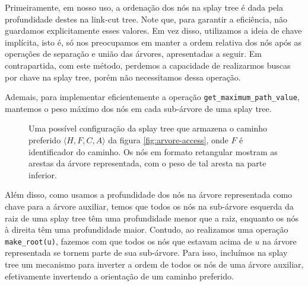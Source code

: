 Primeiramente, em nosso uso, a ordenação dos nós na splay tree é dada pela profundidade destes na link-cut tree. Note que, para garantir a eficiência, não guardamos explicitamente esses valores. Em vez disso, utilizamos a ideia de chave implícita, isto é, só nos preocupamos em manter a ordem relativa dos nós após as operações de separação e união das árvores, apresentadas a seguir. Em contrapartida, com este método, perdemos a capacidade de realizarmos buscas por chave na splay tree, porém não necessitamos dessa operação.

Ademais, para implementar eficientemente a operação \texttt{get\_maximum\_path\_value}, mantemos o peso máximo dos nós em cada sub-árvore de uma splay tree.

\begin{figure}
    \centering
    \caption{Uma possível configuração da splay tree que armazena o caminho preferido $\langle H,F,C,A \rangle$ da figura \ref{fig:arvore-access}, onde $F$ é identificador do caminho. Os nós em formato retangular mostram as arestas da árvore representada, com o peso de tal aresta na parte inferior.}
    \label{fig:splay-path}
\end{figure}

Além disso, como usamos a profundidade dos nós na árvore representada como chave para a árvore auxiliar, temos que todos os nós na sub-árvore esquerda da raiz de uma splay tree têm uma profundidade menor que a raiz, enquanto os nós à direita têm uma profundidade maior. Contudo, ao realizamos uma operação \texttt{make\_root(u)}, fazemos com que todos os nós que estavam acima de $u$ na árvore representada se tornem parte de sua sub-árvore. Para isso, incluímos na splay tree um mecanismo para inverter a ordem de todos os nós de uma árvore auxiliar, efetivamente invertendo a orientação de um caminho preferido.

